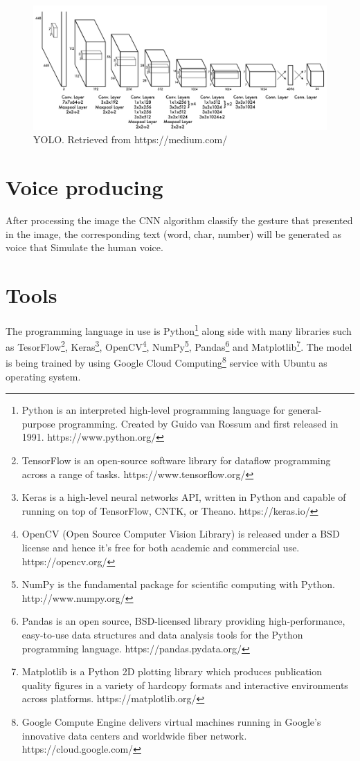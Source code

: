 \documentclass[12pt]{report}
\begin{document}
\bigbreak
\bigbreak
\bigbreak


\begin{figure}[h]
    \centering
    \includegraphics[width=1\textwidth]{./images/yolo.png}
    \caption{YOLO. Retrieved from https://medium.com/}
    \label{fig:frcnn}
\end{figure} 


\newpage

\section{Voice producing}

After processing the image the CNN algorithm classify the gesture
that presented in the image, the corresponding text (word, char, number)
will be generated as voice that Simulate the human voice. 

\section{Tools}

The programming language in use is Python\footnote{Python is an interpreted high-level programming language for general-purpose programming. Created by Guido van Rossum and first released in 1991. https://www.python.org/} along side with many
libraries such as TesorFlow\footnote{TensorFlow is an open-source software library for dataflow programming across a range of tasks. https://www.tensorflow.org/},
Keras\footnote{Keras is a high-level neural networks API, written in Python and capable of running on top of TensorFlow, CNTK, or Theano. https://keras.io/}, 
OpenCV\footnote{OpenCV (Open Source Computer Vision Library) is released under a BSD license and hence it’s free for both academic and commercial use. https://opencv.org/}, 
NumPy\footnote{NumPy is the fundamental package for scientific computing with Python. http://www.numpy.org/}, 
Pandas\footnote{Pandas is an open source, BSD-licensed library providing high-performance, easy-to-use data structures and data analysis tools for the Python programming language. https://pandas.pydata.org/}
and Matplotlib\footnote{Matplotlib is a Python 2D plotting library which produces publication quality figures in a variety of hardcopy formats and interactive environments across platforms. https://matplotlib.org/}.
The model is being trained by using Google Cloud Computing\footnote{Google Compute Engine delivers virtual machines running in Google's innovative data centers and worldwide fiber network. https://cloud.google.com/} service with Ubuntu as operating system.


\renewcommand\bibname{References}            

\end{document}
